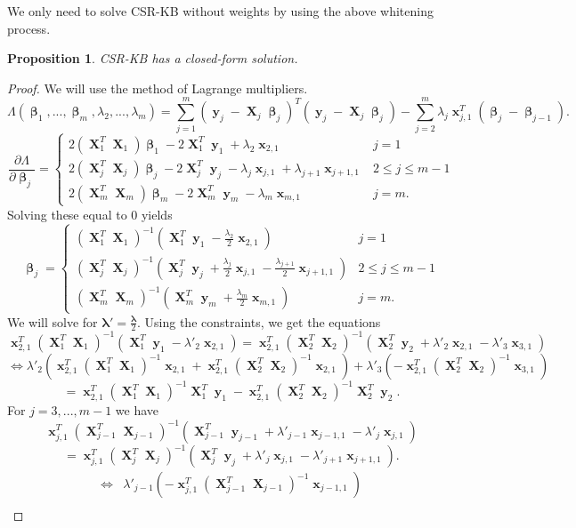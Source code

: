 \documentclass[12pt]{article}
\DeclareMathOperator{\bx}{\mathbf{x}}
\DeclareMathOperator{\bX}{\mathbf{X}}
\DeclareMathOperator{\by}{\mathbf{y}}
\DeclareMathOperator{\bbeta}{\boldsymbol{\beta}}
\newtheorem{prop}{Proposition}
\begin{document}
We only need to solve CSR-KB without weights by using the above whitening process.
\begin{prop} \label{prop:main}
CSR-KB has a closed-form solution. 
\end{prop}
\begin{proof}
We will use the method of Lagrange multipliers.
$$\Lambda(\bbeta_1,...,\bbeta_m,\lambda_2,...,\lambda_m) =  \sum_{j=1}^m (\by_j-\bX_j\bbeta_j)^T(\by_j-\bX_j\bbeta_j)-\sum_{j=2}^m\lambda_j\bx_{j, 1}^T (\bbeta_j - \bbeta_{j-1}).$$
$$\frac{\partial \Lambda}{\partial \bbeta_j} = \begin{cases}
2(\bX_1^T  \bX_1)\bbeta_1 - 2\bX_1^T  \by_1 +\lambda_{2}\bx_{2, 1} & j=1 \\
2(\bX_j^T  \bX_j)\bbeta_j - 2\bX_j^T  \by_j - \lambda_j\bx_{j, 1}+\lambda_{j+1}\bx_{j+1, 1} & 2 \leq j \leq m-1 \\
2(\bX_m^T \bX_m)\bbeta_m - 2\bX_m^T \by_m - \lambda_m\bx_{m, 1} & j=m.
\end{cases}$$
Solving these equal to $0$ yields
\begin{equation} \label{eqn:beta}
\bbeta_j=\begin{cases}
(\bX_1^T  \bX_1)^{-1}(\bX_1^T \by_1 -\frac{\lambda_{2}}{2}\bx_{2, 1}) & j=1 \\
(\bX_j^T  \bX_j)^{-1}(\bX_j^T \by_j + \frac{\lambda_j}{2}\bx_{j, 1}-\frac{\lambda_{j+1}}{2}\bx_{j+1, 1}) & 2 \leq j \leq m-1 \\
(\bX_m^T \bX_m)^{-1}(\bX_m^T \by_m + \frac{\lambda_m}{2}\bx_{m, 1}) & j=m.
\end{cases}
\end{equation}
We will solve for $\boldsymbol{\lambda}'=\frac{\boldsymbol{\lambda}}{2}$. Using the constraints, we get the equations
$$\bx_{2,1}^T(\bX_1^T  \bX_1)^{-1}\left(\bX_1^T \by_1 -\lambda'_{2}\bx_{2, 1}\right)=\bx_{2,1}^T(\bX_2^T  \bX_2)^{-1}\left(\bX_2^T\by_2 + \lambda'_{2}\bx_{2, 1}-\lambda'_{3}\bx_{3, 1}\right) $$
$$\iff \lambda'_{2}\left(\bx_{2,1}^T(\bX_1^T \bX_1)^{-1}\bx_{2, 1}+\bx_{2,1}^T(\bX_2^T \bX_2)^{-1}\bx_{2, 1} \right) + \lambda'_3\left(-\bx_{2,1}^T(\bX_2^T \bX_2)^{-1}\bx_{3, 1} \right) $$
$$=\bx_{2,1}^T(\bX_1^T  \bX_1)^{-1}\bX_1^T \by_1-\bx_{2,1}^T(\bX_2^T  \bX_2)^{-1}\bX_2^T \by_2.$$
For $j=3, ..., m-1$ we have
$$\bx_{j,1}^T(\bX_{j-1}^T  \bX_{j-1})^{-1}\left(\bX_{j-1}^T  \by_{j-1} + \lambda'_{j-1}\bx_{j-1, 1}-\lambda'_{j}\bx_{j, 1}\right)$$
$$= \bx_{j,1}^T(\bX_j^T  \bX_j)^{-1}\left( \bX_j^T \by_j + \lambda'_{j}\bx_{j, 1} -\lambda'_{j+1}\bx_{j+1, 1}\right).$$
\begin{align*} 
\iff &  \lambda'_{j-1} \left(-\bx_{j,1}^T(\bX_{j-1}^T  \bX_{j-1})^{-1}\bx_{j-1, 1}\right) \\ 

\end{align*}
\end{proof}
\end{document}
